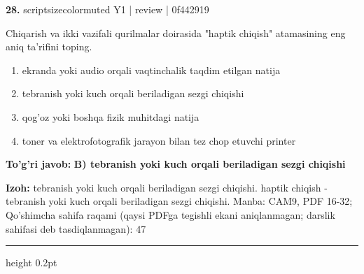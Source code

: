 \documentclass[10pt,a4paper]{article}
\begin{document}
{\bfseries\sffamily\color{ink} 28.} {scriptsizecolor{muted} Y1 | review | 0f442919}
\par
Chiqarish va ikki vazifali qurilmalar doirasida "haptik chiqish" atamasining eng aniq ta'rifini toping.
\begin{enumerate}[label=\Alph*),leftmargin=9mm]
\item ekranda yoki audio orqali vaqtinchalik taqdim etilgan natija
\item tebranish yoki kuch orqali beriladigan sezgi chiqishi
\item qog'oz yoki boshqa fizik muhitdagi natija
\item toner va elektrofotografik jarayon bilan tez chop etuvchi printer
\end{enumerate}
\begin{tcolorbox}[enhanced,breakable,colback=teal!4,colframe=teal!60!black,boxrule=0.45pt,arc=1.2mm,left=2.7mm,right=2.7mm,top=1.8mm,bottom=1.8mm,before skip=2mm,after skip=2mm]
{\bfseries\sffamily\color{teal}To'g'ri javob:} \textbf{B) tebranish yoki kuch orqali beriladigan sezgi chiqishi}
\par\smallskip
{\bfseries Izoh:} tebranish yoki kuch orqali beriladigan sezgi chiqishi. haptik chiqish - tebranish yoki kuch orqali beriladigan sezgi chiqishi. Manba: CAM9, PDF 16-32; Qo'shimcha sahifa raqami (qaysi PDFga tegishli ekani aniqlanmagan; darslik sahifasi deb tasdiqlanmagan): 47
\end{tcolorbox}
\vspace{2mm}\hrule height 0.2pt\vspace{3mm}
\end{document}

